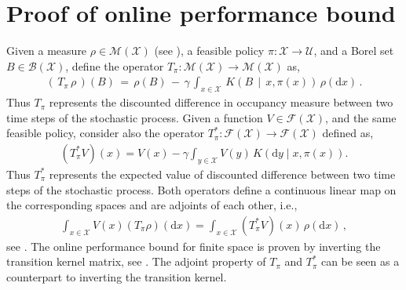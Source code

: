 \documentclass[journal]{IEEEtran}
\newcommand{\mcal}{\mathcal}
\newcommand{\intd}[1]{\mathrm{d}#1}
\begin{document}
\section{Proof of online performance bound} \label{app:proof_bound_online_performance}

Given a measure $\rho\in\mcal{M}(\mcal{X})$ (see \cite[Definition 6.3.4]{hernandez_2012_discreteTimeMCP}), a feasible policy $\pi:\mcal{X} \rightarrow \mcal{U}$, and a Borel set $B \in \mcal{B}(\mcal{X})$, define the operator $T_{\pi}: \mcal{M}(\mcal{X}) \rightarrow \mcal{M}(\mcal{X})$ as,
	\begin{equation} \nonumber
		\begin{aligned}
			\left(\, T_{\pi} \, \rho \,\right)(B) \,=\, \rho(B) \,-\, \gamma \, \int\nolimits_{x\in\mcal{X}} \, K\left( B \,\middle|\, x,\pi(x) \right) \, \rho(\intd{x})
			\,.
		\end{aligned}
	\end{equation}
Thus $T_{\pi}$ represents the discounted difference in occupancy measure between two time steps of the stochastic process. Given a function $V\in\mcal{F}(\mcal{X})$, and the same feasible policy, consider also the operator $T_{\pi}^{\ast}: \mcal{F}(\mcal{X}) \rightarrow \mcal{F}(\mcal{X})$ defined as,
	\begin{equation} \label{eq:lasserre_T_pi_operator_for_functions}
		\begin{aligned}
			\left( T_{\pi}^{\ast}  V \right)\!(x)
				= V(x) - \gamma  \int\nolimits_{y\in\mcal{X}} V(y) \, K\left( \intd{y} \middle| x,\pi(x) \right)
				.
		\end{aligned}
	\end{equation}
Thus $T_{\pi}^\ast$ represents the expected value of discounted difference between two time steps of the stochastic process. Both operators define a continuous linear map on the corresponding spaces and are adjoints of each other, i.e.,
	\begin{equation} \label{eq:appendix_operators_adjoint} \begin{aligned}
			\int\nolimits_{x\in\mcal{X}} V(x) \left( T_{\pi}  \rho \right)(\intd{x})
				=
				\int\nolimits_{x\in\mcal{X}} \left( T_{\pi}^{\ast}  V \right)(x) \, \rho(\intd{x})
				\,,
		\end{aligned}
	\end{equation}
see \cite[Section 6.3]{hernandez_2012_discreteTimeMCP}. The online performance bound for finite space is proven by inverting the transition kernel matrix, see \cite[Theorem 1]{vanRoy_linApproxDP}. The adjoint property of $T_{\pi}$ and $T_{\pi}^\ast$ can be seen as a counterpart to inverting the transition kernel.
\end{document}
